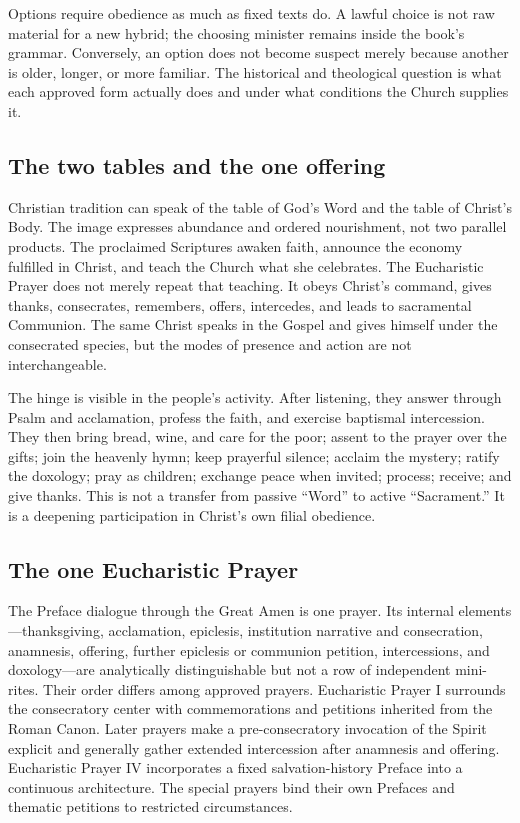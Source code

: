 Options require obedience as much as fixed texts do. A lawful choice is not raw material for a new hybrid; the choosing minister remains inside the book's grammar. Conversely, an option does not become suspect merely because another is older, longer, or more familiar. The historical and theological question is what each approved form actually does and under what conditions the Church supplies it.

\subsection{The two tables and the one offering}

Christian tradition can speak of the table of God's Word and the table of Christ's Body. The image expresses abundance and ordered nourishment, not two parallel products. The proclaimed Scriptures awaken faith, announce the economy fulfilled in Christ, and teach the Church what she celebrates. The Eucharistic Prayer does not merely repeat that teaching. It obeys Christ's command, gives thanks, consecrates, remembers, offers, intercedes, and leads to sacramental Communion. The same Christ speaks in the Gospel and gives himself under the consecrated species, but the modes of presence and action are not interchangeable.

The hinge is visible in the people's activity. After listening, they answer through Psalm and acclamation, profess the faith, and exercise baptismal intercession. They then bring bread, wine, and care for the poor; assent to the prayer over the gifts; join the heavenly hymn; keep prayerful silence; acclaim the mystery; ratify the doxology; pray as children; exchange peace when invited; process; receive; and give thanks. This is not a transfer from passive ``Word'' to active ``Sacrament.'' It is a deepening participation in Christ's own filial obedience.

\subsection{The one Eucharistic Prayer}

The Preface dialogue through the Great Amen is one prayer. Its internal elements---thanksgiving, acclamation, epiclesis, institution narrative and consecration, anamnesis, offering, further epiclesis or communion petition, intercessions, and doxology---are analytically distinguishable but not a row of independent mini-rites. Their order differs among approved prayers. Eucharistic Prayer I surrounds the consecratory center with commemorations and petitions inherited from the Roman Canon. Later prayers make a pre-consecratory invocation of the Spirit explicit and generally gather extended intercession after anamnesis and offering. Eucharistic Prayer IV incorporates a fixed salvation-history Preface into a continuous architecture. The special prayers bind their own Prefaces and thematic petitions to restricted circumstances.

